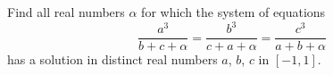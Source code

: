 Find all real numbers $\alpha$ for which the system of equations
\[
    \frac{a^3}{b + c + \alpha}
=
    \frac{b^3}{c + a + \alpha}
=
    \frac{c^3}{a + b + \alpha}
\]
has a solution in distinct real numbers $a$, $b$, $c$ in $[-1, 1]$.

\solution

